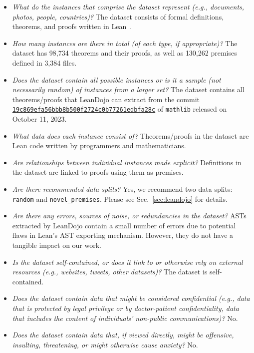 \documentclass{article}
\newcommand\numproofs{98,734}
\newcommand\numpremises{130,262}
\newcommand\numfiles{3,384}
\begin{document}
\begin{itemize}[leftmargin=*]
\item \emph{What do the instances that comprise the dataset represent (e.g., documents, photos, people, countries)?} The dataset consists of formal definitions, theorems, and proofs written in Lean~\cite{de2015lean}.

\item \emph{How many instances are there in total (of each type, if appropriate)?} The dataset has {\numproofs} theorems and their proofs, as well as {\numpremises} premises defined in {\numfiles} files.

\item \emph{Does the dataset contain all possible instances or is it a sample (not necessarily random) of instances from a larger set?} The dataset contains all theorems/proofs that LeanDojo can extract from the commit \href{https://github.com/leanprover-community/mathlib/tree/19c869efa56bbb8b500f2724c0b77261edbfa28c}{\texttt{19c869efa56bbb8b500f2724c0b77261edbfa28c}} of \texttt{mathlib} released on October 11, 2023.

\item \emph{What data does each instance consist of?} Theorems/proofs in the dataset are Lean code written by programmers and mathematicians.

\item \emph{Are relationships between individual instances made explicit?} Definitions in the dataset are linked to proofs using them as premises.

\item \emph{Are there recommended data splits?} Yes, we recommend two data splits: \texttt{random} and \texttt{novel\_premises}. 
Please see Sec.~\ref{sec:leandojo} for details.

\item \emph{Are there any errors, sources of noise, or redundancies in the dataset?} ASTs extracted by LeanDojo contain a small number of errors due to potential flaws in Lean's AST exporting mechanism. However, they do not have a tangible impact on our work.

\item \emph{Is the dataset self-contained, or does it link to or otherwise rely on external resources (e.g., websites, tweets, other datasets)?} The dataset is self-contained.

\item \emph{Does the dataset contain data that might be considered confidential (e.g., data that is protected by legal privilege or by doctor-patient confidentiality, data that includes the content of individuals’ non-public communications)?} No.

\item \emph{Does the dataset contain data that, if viewed directly, might be offensive, insulting, threatening, or might otherwise cause anxiety?} No.

\end{itemize}
\end{document}
